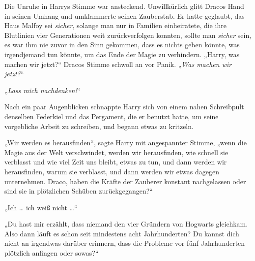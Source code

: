 Die Unruhe in Harrys Stimme war ansteckend. Unwillkürlich glitt Dracos Hand in seinen Umhang und umklammerte seinen Zauberstab. Er hatte geglaubt, das Haus Malfoy sei \emph{sicher}, solange man nur in Familien einheiratete, die ihre Blutlinien vier Generationen weit zurückverfolgen konnten, sollte man \emph{sicher} sein, es war ihm nie zuvor in den Sinn gekommen, dass es nichts geben könnte, was irgendjemand tun könnte, um das Ende der Magie zu verhindern.
„Harry, was machen wir jetzt?“ Dracos Stimme schwoll an vor Panik.
„\emph{Was machen wir jetzt?}“

„\emph{Lass mich nachdenken!}“

Nach ein paar Augenblicken schnappte Harry sich von einem nahen Schreibpult denselben Federkiel und das Pergament, die er benutzt hatte, um seine vorgebliche Arbeit zu schreiben, und begann etwas zu kritzeln.

„Wir werden es herausfinden“, sagte Harry mit angespannter Stimme, „wenn die Magie aus der Welt verschwindet, werden wir herausfinden, wie schnell sie verblasst und wie viel Zeit uns bleibt, etwas zu tun, und dann werden wir herausfinden, warum sie verblasst, und dann werden wir etwas dagegen unternehmen. Draco, haben die Kräfte der Zauberer konstant nachgelassen oder sind sie in plötzlichen Schüben zurückgegangen?“

„Ich … ich weiß nicht …“

„Du hast mir erzählt, dass niemand den vier Gründern von Hogwarts gleichkam. Also dann läuft es schon seit mindestens acht Jahrhunderten? Du kannst dich nicht an irgendwas darüber erinnern, dass die Probleme vor fünf Jahrhunderten plötzlich anfingen oder sowas?“

